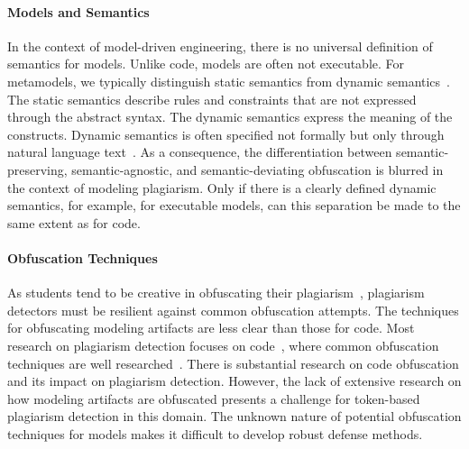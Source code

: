 \paragraph{Models and Semantics}
In the context of model-driven engineering, there is no universal definition of semantics for models.
Unlike code, models are often not executable. For metamodels, we typically distinguish static semantics from dynamic semantics~\cite{Stahl2006}. The static semantics describe rules and constraints that are not expressed through the abstract syntax. The dynamic semantics express the meaning of the constructs. Dynamic semantics is often specified not formally but only through natural language text~\cite{Brambilla2017}.
As a consequence, the differentiation between semantic-preserving, semantic-agnostic, and semantic-deviating obfuscation is blurred in the context of modeling plagiarism. Only if there is a clearly defined dynamic semantics, for example, for executable models, can this separation be made to the same extent as for code.

\paragraph{Obfuscation Techniques}
As students tend to be creative in obfuscating their plagiarism~\cite{Saglam2023, Karnalim2016}, plagiarism detectors must be resilient against common obfuscation attempts.
The techniques for obfuscating modeling artifacts are less clear than those for code. Most research on plagiarism detection focuses on code~\cite{prechelt2000, MOSS, Maertens2022}, where common obfuscation techniques are well researched~\cite{Faidhi1987, Karnalim2016, Novak2019, Novak2020}. There is substantial research on code obfuscation and its impact on plagiarism detection. However, the lack of extensive research on how modeling artifacts are obfuscated presents a challenge for token-based plagiarism detection in this domain. The unknown nature of potential obfuscation techniques for models makes it difficult to develop robust defense methods.
